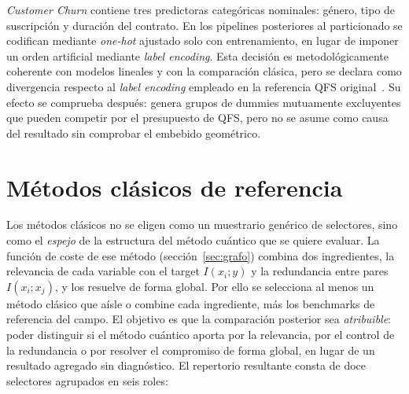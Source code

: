 \textit{Customer Churn} contiene tres predictoras categóricas nominales:
género, tipo de suscripción y duración del contrato. En los pipelines
posteriores al particionado se codifican mediante \textit{one-hot}
ajustado solo con entrenamiento, en lugar de imponer un orden artificial
mediante \textit{label encoding}. Esta decisión es metodológicamente
coherente con modelos lineales y con la comparación clásica, pero se
declara como divergencia respecto al \textit{label encoding} empleado en
la referencia QFS original~\cite{orquin2026}. Su efecto se comprueba después: genera grupos de
dummies mutuamente excluyentes que pueden competir por el presupuesto de
QFS, pero no se asume como causa del resultado sin comprobar el embebido
geométrico.

\section{Métodos clásicos de referencia}
\label{sec:clasicos}

Los métodos clásicos no se eligen como un muestrario genérico de
selectores, sino como el \emph{espejo} de la estructura del método
cuántico que se quiere evaluar. La función de coste de ese método
(sección~\ref{sec:grafo}) combina dos ingredientes, la relevancia de
cada variable con el target $I(x_i;y)$ y la redundancia entre pares
$I(x_i;x_j)$, y los resuelve de forma global. Por ello se selecciona al
menos un método clásico que aísle o combine cada ingrediente, más los
benchmarks de referencia del campo. El objetivo es que la comparación
posterior sea \emph{atribuible}: poder distinguir si el método cuántico
aporta por la relevancia, por el control de la redundancia o por
resolver el compromiso de forma global, en lugar de un resultado
agregado sin diagnóstico. El repertorio resultante consta de doce
selectores agrupados en seis roles:

